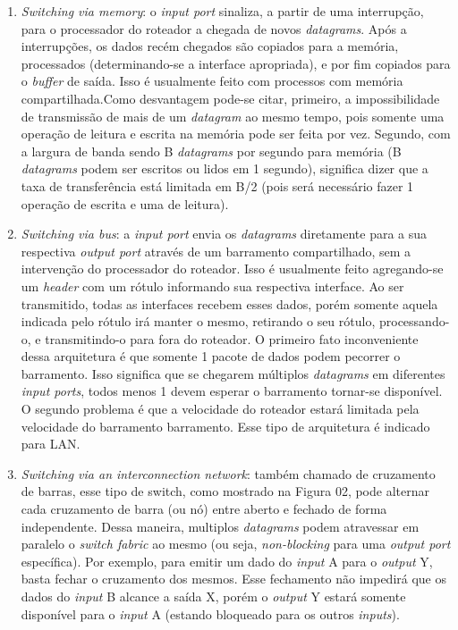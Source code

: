 \begin{enumerate}
\def\labelenumi{\arabic{enumi}.}

\item
  \emph{Switching via memory}: o \emph{input port} sinaliza, a partir de
  uma interrupção, para o processador do roteador a chegada de novos
  \emph{datagrams}. Após a interrupções, os dados recém chegados são
  copiados para a memória, processados (determinando-se a interface
  apropriada), e por fim copiados para o \emph{buffer} de saída. Isso é
  usualmente feito com processos com memória compartilhada.Como
  desvantagem pode-se citar, primeiro, a impossibilidade de transmissão
  de mais de um \emph{datagram} ao mesmo tempo, pois somente uma
  operação de leitura e escrita na memória pode ser feita por vez.
  Segundo, com a largura de banda sendo B \emph{datagrams} por segundo
  para memória (B \emph{datagrams} podem ser escritos ou lidos em 1
  segundo), significa dizer que a taxa de transferência está limitada em
  B/2 (pois será necessário fazer 1 operação de escrita e uma de
  leitura).
\item
  \emph{Switching via bus}: a \emph{input port} envia os
  \emph{datagrams} diretamente para a sua respectiva \emph{output port}
  através de um barramento compartilhado, sem a intervenção do
  processador do roteador. Isso é usualmente feito agregando-se um
  \emph{header} com um rótulo informando sua respectiva interface. Ao
  ser transmitido, todas as interfaces recebem esses dados, porém
  somente aquela indicada pelo rótulo irá manter o mesmo, retirando o
  seu rótulo, processando-o, e transmitindo-o para fora do roteador. O
  primeiro fato inconveniente dessa arquitetura é que somente 1 pacote de
  dados podem pecorrer o barramento. Isso significa que se chegarem
  múltiplos \emph{datagrams} em diferentes \emph{input ports}, todos
  menos 1 devem esperar o barramento tornar-se disponível. O segundo
  problema é que a velocidade do roteador estará limitada pela
  velocidade do barramento barramento. Esse tipo de arquitetura é
  indicado para LAN.
\item
  \emph{Switching via an interconnection network}: também chamado de
  cruzamento de barras, esse tipo de switch, como mostrado na Figura 02,
  pode alternar cada cruzamento de barra (ou nó) entre aberto e fechado
  de forma independente. Dessa maneira, multiplos \emph{datagrams} podem
  atravessar em paralelo o \emph{switch fabric} ao mesmo (ou seja,
  \emph{non-blocking} para uma \emph{output port} específica). Por
  exemplo, para emitir um dado do \emph{input} A para o \emph{output} Y,
  basta fechar o cruzamento dos mesmos. Esse fechamento não impedirá que
  os dados do \emph{input} B alcance a saída X, porém o \emph{output} Y
  estará somente disponível para o \emph{input} A (estando bloqueado
  para os outros \emph{inputs}).
\end{enumerate}

